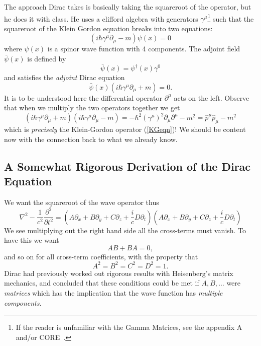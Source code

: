 The approach Dirac takes is basically taking the squareroot of the operator, but he does it with class. He uses a clifford algebra with generators $\gamma^\mu$\footnote{If the reader is unfamiliar with the Gamma Matrices, see the appendix A and/or CORE~\cite{Borodulin:1995xd}.} such that the squareroot of the Klein Gordon equation breaks into two equations:
\begin{equation}\label{diracEqn}
(i\hbar\gamma^\mu\partial_\mu - m)\psi(x) = 0
\end{equation}
where $\psi(x)$ is a spinor wave function with 4 components. The adjoint field $\bar{\psi}(x)$ is defined by 
\begin{equation}
\bar{\psi}(x) = \psi^{\dag}(x)\gamma^0
\end{equation}
and satisfies the \emph{adjoint} Dirac equation
\begin{equation}\label{adjointEqn}
\bar{\psi}(x)(i\hbar\gamma^\mu\partial_\mu + m) = 0.
\end{equation}
It is to be understood here the differential operator $\partial^\mu$ acts on the left. Observe that when we multiply the two operators together we get
\begin{equation}
(i\hbar\gamma^\mu\partial_\mu + m)(i\hbar\gamma^\mu\partial_\mu - m) = -\hbar^{2}\left(\gamma^\mu\right)^2\partial_{\mu}\partial^{\mu} - m^2 = \hat{p}^\mu\hat{p}_\mu - m^2 
\end{equation}
which is \emph{precisely} the Klein-Gordon operator (\ref{KGeqn})! We should be content now with the connection back to what we already know. 


\subsection{A Somewhat Rigorous Derivation of the Dirac Equation}

We want the squareroot of the wave operator thus
\begin{equation}
\nabla^2 - \frac{1}{c^2}\frac{\partial^2}{\partial t^2} = (A \partial_x + B \partial_y + C \partial_z + \frac{i}{c}D \partial_t)(A \partial_x + B \partial_y + C \partial_z + \frac{i}{c}D \partial_t)
\end{equation}
We see multiplying out the right hand side all the cross-terms must vanish. To have this we want
\begin{equation}
AB + BA = 0, 
\end{equation}
and so on for all cross-term coefficients, with the property that
\begin{equation}
A^2 = B^2 = C^2 = D^2 = 1.
\end{equation}
Dirac had previously worked out rigorous results with Heisenberg's matrix mechanics, and concluded that these conditions could be met if $A, B,\ldots$ were \emph{matrices} which has the implication that the wave function has \emph{multiple components}. 

